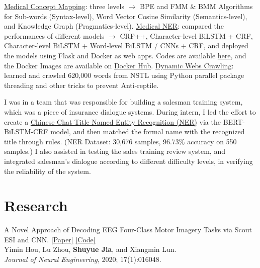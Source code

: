 \documentclass{my_cv}
\begin{document}
\workitemsthree
{\href{https://github.com/SuperBruceJia/Medical-Concept-Mapping}{Medical Concept Mapping}: three levels $\rightarrow$ BPE and FMM \& BMM Algorithms for Sub-words (Syntax-level), Word Vector Cosine Similarity (Semantics-level), and Knowledge Graph (Pragmatics-level).}
{\href{https://github.com/SuperBruceJia/MedicalNER}{Medical NER}: compared the performances of different models $\rightarrow$ CRF++, Character-level BiLSTM + CRF, Character-level BiLSTM + Word-level BiLSTM / CNNs + CRF, and deployed the models using Flask and Docker as web apps. Codes are available \href{https://github.com/SuperBruceJia/pytorch-flask-deploy-webapp}{here}, and the Docker Images are available on \href{https://hub.docker.com/u/shuyuej}{Docker Hub}.}
{\href{https://github.com/SuperBruceJia/dynamic-web-crawlering-python}{Dynamic Webs Crawling}: learned and crawled 620,000 words from NSTL using Python parallel package threading and other tricks to prevent Anti-reptile.}

\workitemstwo
{I was in a team that was responsible for building a salesman training system, which was a piece of insurance dialogue systems. During intern, I led the effort to create a \href{https://github.com/SuperBruceJia/Chinese-Chat-Title-NER-BERT-BiLSTM-CRF}{Chinese Chat Title Named Entity Recognition (NER)} via the BERT-BiLSTM-CRF model, and then matched the formal name with the recognized title through rules. (NER Dataset: 30,676 samples, 96.73\% accuracy on 550 samples.)}
{I also assisted in testing the sales training review system, and integrated salesman’s dialogue according to different difficulty levels, in verifying the reliability of the system.}

\hspace*{\fill} 

\section{Research}
\workitemsone
{A Novel Approach of Decoding EEG Four-Class Motor Imagery Tasks via Scout ESI and CNN. \href{https://iopscience.iop.org/article/10.1088/1741-2552/ab4af6/meta}{[Paper]} \href{https://github.com/SuperBruceJia/EEG-Motor-Imagery-Classification-CNNs-TensorFlow}{[Code]}\\
	Yimin Hou, Lu Zhou, \textbf{Shuyue Jia}, and Xiangmin Lun. \\
	\emph{Journal of Neural Engineering}, 2020; 17(1):016048.}
\end{document}
